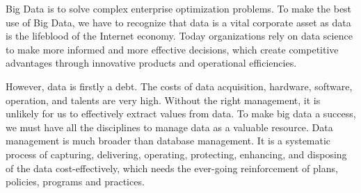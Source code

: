 \documentclass[11pt]{book}
\begin{document}
Big Data is to solve complex enterprise optimization problems. To make the best use of Big Data, we have to recognize that data is a vital corporate asset as data is the lifeblood of the Internet economy. Today organizations rely on data science to make more informed and more effective decisions, which create competitive advantages through innovative products and operational efficiencies.

However, data is firstly a debt. The costs of data acquisition, hardware, software, operation, and talents are very high. Without the right management, it is unlikely for us to effectively extract values from data. To make big data a success, we must have all the disciplines to manage data as a valuable resource. Data management is much broader than database management. It is a systematic process of capturing, delivering, operating, protecting, enhancing, and disposing of the data cost-effectively, which needs the ever-going reinforcement of plans, policies, programs and practices. 
\end{document}
